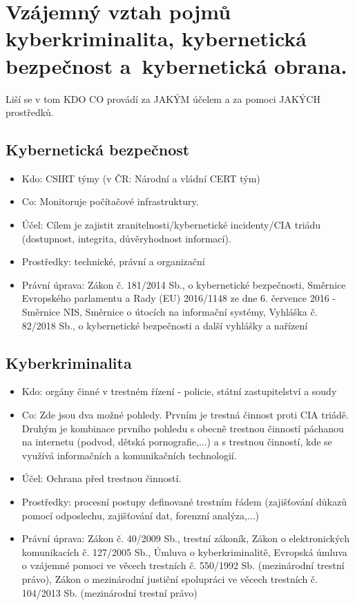 \section{Vzájemný vztah pojmů kyberkriminalita, kybernetická bezpečnost a~kybernetická obrana.}
Liší se v tom KDO CO provádí za JAKÝM účelem a za pomoci JAKÝCH prostředků.

\subsection{Kybernetická bezpečnost}
\begin{itemize}
    \item Kdo: CSIRT týmy (v ČR: Národní a vládní CERT tým)
    \item Co: Monitoruje počítačové infrastruktury.
    \item Účel: Cílem je zajistit zranitelnosti/kybernetické incidenty/CIA triádu (dostupnost, integrita, důvěryhodnost informací). \item Prostředky: technické, právní a organizační
    \item Právní úprava: Zákon č. 181/2014 Sb., o kybernetické bezpečnosti, Směrnice Evropského parlamentu a Rady (EU) 2016/1148 ze dne 6. července 2016 - Směrnice NIS, Směrnice o útocích na informační systémy, Vyhláška č. 82/2018 Sb., o kybernetické bezpečnosti a další vyhlášky a nařízení
\end{itemize}

\subsection{Kyberkriminalita}
\begin{itemize}
    \item Kdo: orgány činné v trestném řízení - policie, státní zastupitelství a soudy
    \item Co: Zde jsou dva možné pohledy. Prvním je trestná činnost proti CIA triádě. Druhým je kombinace prvního pohledu s obecně trestnou činností páchanou na internetu (podvod, dětská pornografie,...)  a s trestnou činností, kde se využívá informačních a komunikačních technologií.
    \item Účel: Ochrana před trestnou činností. 
    \item Prostředky: procesní postupy definované trestním řádem (zajišťování důkazů pomocí odposlechu, zajišťování dat, forenzní analýza,...)
    \item Právní úprava: Zákon č. 40/2009 Sb., trestní zákoník, Zákon o elektronických komunikacích č. 127/2005 Sb., Úmluva o kyberkriminalitě, Evropská úmluva o vzájemné pomoci ve věcech trestních č. 550/1992 Sb. (mezinárodní trestní právo),  Zákon o mezinárodní justiční spolupráci ve věcech trestních č. 104/2013 Sb. (mezinárodní trestní právo)
\end{itemize}

